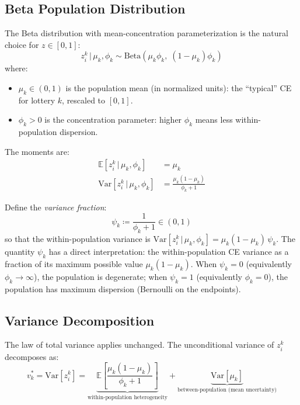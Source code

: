 \documentclass[11pt,a4paper]{article}
\theoremstyle{definition}
\newcommand{\E}{\mathbb{E}}
\newcommand{\Var}{\mathrm{Var}}
\newcommand{\given}{\,|\,}
\begin{document}
\subsection{Beta Population Distribution}
\label{sec:beta_pop}

The Beta distribution with mean-concentration parameterization is the natural
choice for $z \in [0,1]$:
\begin{equation}
    \label{eq:beta_pop}
    z_i^k \given \mu_k, \phi_k \sim
    \mathrm{Beta}(\mu_k \phi_k, \; (1 - \mu_k)\phi_k)
\end{equation}
where:
\begin{itemize}
    \item $\mu_k \in (0,1)$ is the population mean (in normalized units):
    the ``typical'' CE for lottery $k$, rescaled to $[0,1]$.
    \item $\phi_k > 0$ is the concentration parameter: higher $\phi_k$ means
    less within-population dispersion.
\end{itemize}
The moments are:
\begin{align}
    \E[z_i^k \given \mu_k, \phi_k] &= \mu_k \\
    \Var[z_i^k \given \mu_k, \phi_k] &= \frac{\mu_k(1-\mu_k)}{\phi_k + 1}
    \label{eq:beta_var}
\end{align}

Define the \emph{variance fraction}:
\begin{equation}
    \label{eq:psi_def}
    \psi_k \coloneqq \frac{1}{\phi_k + 1} \in (0,1)
\end{equation}
so that the within-population variance is
$\Var[z_i^k \given \mu_k, \phi_k] = \mu_k(1-\mu_k) \, \psi_k$. The quantity
$\psi_k$ has a direct interpretation: the within-population CE variance as a
fraction of its maximum possible value $\mu_k(1-\mu_k)$. When $\psi_k = 0$
(equivalently $\phi_k \to \infty$), the population is degenerate; when
$\psi_k = 1$ (equivalently $\phi_k = 0$), the population has maximum
dispersion (Bernoulli on the endpoints).

\subsection{Variance Decomposition}

The law of total variance applies unchanged. The unconditional variance of
$z_i^k$ decomposes as:
\begin{equation}
    \label{eq:beta_total_var}
    v_k^* = \Var[z_i^k]
    = \underbrace{\E\!\left[\frac{\mu_k(1-\mu_k)}{\phi_k + 1}\right]}_{\text{within-population heterogeneity}}
    + \underbrace{\Var[\mu_k]}_{\text{between-population (mean uncertainty)}}
\end{equation}
\end{document}
